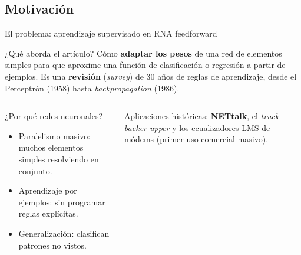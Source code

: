\documentclass[aspectratio=169, 11pt, xcolor={dvipsnames,table}]{beamer}
\newcommand{\azul}[1]{\textcolor{UsachAzul}{#1}}
\newcommand{\naranja}[1]{\textcolor{UsachNaranja}{#1}}
\begin{document}
\subsection{Motivación}
\begin{frame}{El problema: aprendizaje supervisado en RNA feedforward}
\begin{block}{¿Qué aborda el artículo?}
Cómo \textbf{adaptar los pesos} de una red de elementos simples para que aproxime una función de
\azul{clasificación} o \azul{regresión} a partir de ejemplos. Es una \textbf{revisión} (\emph{survey})
de 30 años de reglas de aprendizaje, desde el Perceptrón (1958) hasta \emph{backpropagation} (1986).
\end{block}
\begin{columns}[T]
\begin{block}{¿Por qué redes neuronales?}
\begin{itemize}
  \item \naranja{Paralelismo masivo}: muchos elementos simples resolviendo en conjunto.
  \item \naranja{Aprendizaje por ejemplos}: sin programar reglas explícitas.
  \item \naranja{Generalización}: clasifican patrones no vistos.
\end{itemize}
\end{block}
\begin{tipbox}
Aplicaciones históricas: \textbf{NETtalk}, el \emph{truck backer-upper} y los ecualizadores LMS
de módems (primer uso comercial masivo).
\end{tipbox}
\end{columns}
\end{frame}
\end{document}
